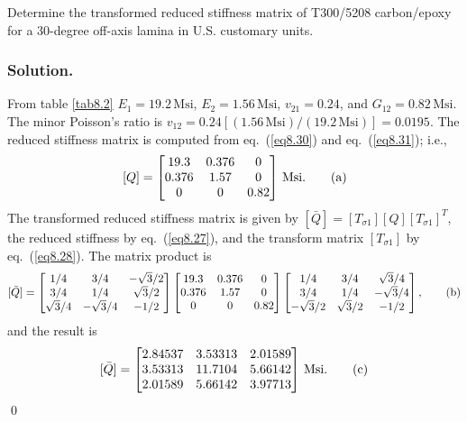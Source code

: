 \documentclass{AeroStructure-ERJohnson}
\begin{document}
\begin{example*}\label{ex8.1}Determine the transformed reduced
stiffness matrix of T300/5208 carbon/epoxy for a 30-degree
off-axis lamina in U.S. customary units.

\subsubsection{Solution.} From table \ref{tab8.2}
$E_{1}=19.2\,\mathrm{Msi}$, $E_{2}=1.56\,\mathrm{Msi}$,
$v_{21}=0.24$, and $G_{12}=0.82\,\mathrm{Msi}$. The minor Poisson's
ratio is $v_{12}=0.24[(1.56\,\mathrm{Msi})
/(19.2\,\mathrm{Msi})]=0.0195$. The reduced stiffness matrix is
computed from eq.~(\ref{eq8.30}) and eq.~(\ref{eq8.31}); i.e.,
\begin{align}\label{ex8.1a}
[Q]=\left[\begin{array}{@{}ccc@{}} 19.3 & 0.376 & 0\\
0.376 &
1.57 & 0\\
0 & 0 & 0.82 \end{array}\right]\,\mathrm{Msi}.\tag{a}
\end{align}
The transformed reduced stiffness matrix is given by $
[\bar{Q}]=\left[T_{\sigma 1}\right][Q]\left[T_{\sigma
1}\right]^{T}$\!, the reduced stiffness by eq.~(\ref{eq8.27}), and
the transform matrix $ \left[T_{\sigma 1}\right] $ by
eq.~(\ref{eq8.28}). The matrix product is
\begin{align}\label{ex8.1b}
[\bar{Q}]=\left[\begin{array}{@{}ccc@{}} 1/ 4 & 3/ 4 & -\sqrt{3}
/ 2\\
3/ 4 & 1/ 4 & \sqrt{3}/ 2\\
\sqrt{3}/ 4 & -\sqrt{3}/
4 & -1/ 2
\end{array}\right]\left[\begin{array}{@{}ccc@{}} 19.3 & 0.376 & 0\\
0.376 & 1.57 & 0\\
0 & 0 & 0.82
\end{array}\right]\left[\begin{array}{@{}ccc@{}} 1/ 4 & 3/ 4 &
\sqrt{3}/ 4\\
3/ 4 & 1/ 4 & -\sqrt{3}/ 4\\
-\sqrt{3}/ 2 &
\sqrt{3}/ 2 & -1/ 2 \end{array}\right],\tag{b}
\end{align}
and the result is\pagebreak
\begin{align}\label{ex8.1c}
[\bar{Q}]=\left[\begin{array}{@{}lll@{}} 2.84537 & 3.53313 & 2.01589\\
3.53313 & 11.7104 & 5.66142\\
2.01589 & 5.66142 & 3.97713
\end{array}\right]\,\mathrm{Msi}.\tag{c}
\end{align}\hfill\qed
\end{example*}
\end{document}
